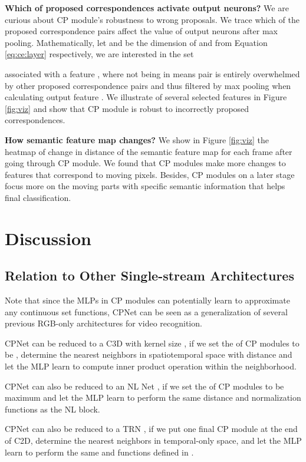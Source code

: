 \documentclass[10pt,twocolumn,letterpaper]{article}
\begin{document}
\textbf{Which of proposed correspondences activate output neurons?} We are curious about CP module's robustness to wrong proposals. We trace which of the  proposed correspondence pairs affect the value of output neurons after max pooling. Mathematically, let  and  be the dimension  of  and  from Equation \eqref{eq:ce:layer} respectively, we are interested in the set

associated with a feature , where  not being in  means pair  is entirely overwhelmed by other proposed correspondence pairs and thus filtered by max pooling when calculating output feature . We illustrate  of several selected features in Figure \ref{fig:viz} and show that CP module is robust to incorrectly proposed correspondences. 


\textbf{How semantic feature map changes?} We show in Figure \ref{fig:viz} the heatmap of change in  distance of the semantic feature map for each frame after going through CP module.
We found that CP modules make more changes to features that correspond to moving pixels. Besides, CP modules on a later stage focus more on the moving parts with specific semantic information that helps final classification.






\section{Discussion}


\subsection{Relation to Other Single-stream Architectures}

Note that since the MLPs in CP modules can potentially learn to approximate any continuous set functions, CPNet can be seen as a generalization of several previous RGB-only architectures for video recognition. 

CPNet can be reduced to a C3D  \cite{C3D} with kernel size , if we set the  of CP modules to be , determine the  nearest neighbors in spatiotemporal space with  distance and let the MLP learn to compute inner product operation within the   neighborhood.

CPNet can also be reduced to an NL Net \cite{NLNet}, if we set the  of CP modules to be maximum  and let the MLP learn to perform the same distance and normalization functions as the NL block.

CPNet can also be reduced to a TRN \cite{TRN}, if we put one final CP module at the end of C2D, determine the  nearest neighbors in temporal-only space, and let the MLP learn to perform the same  and  functions defined in \cite{TRN}. 
\end{document}
